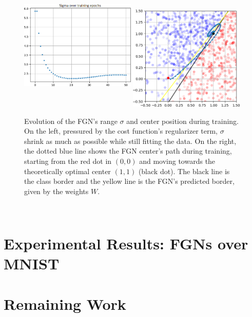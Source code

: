 \documentclass[12pt,oneside]{CUNY_PhD}
\begin{document}
\begin{figure}[!htbp]
    \centering
    \includegraphics[width=0.49\textwidth,height=6.35cm]{images/2D-single-neuron/2d-easy-sigma-training-cropped.png}
    \includegraphics[width=0.49\textwidth]{images/2D-single-neuron/2d-easy-center-path-cropped.png}
    \caption{Evolution of the FGN's range $\sigma$ and center position during training. On the left, pressured by the cost function's regularizer term, $\sigma$ shrink as much as possible while still fitting the data.  On the right, the dotted blue line shows the FGN center's path during training, starting from the red dot in $(0,0)$ and moving towards the theoretically optimal center $(1,1)$ (black dot). The black line is the class border and the yellow line is the FGN's predicted border, given by the weights $W$.}
    \label{fig:single-fgn-3}
\end{figure}\\

\chapter{Experimental Results: FGNs over MNIST}

\chapter{Remaining Work}
\end{document}
